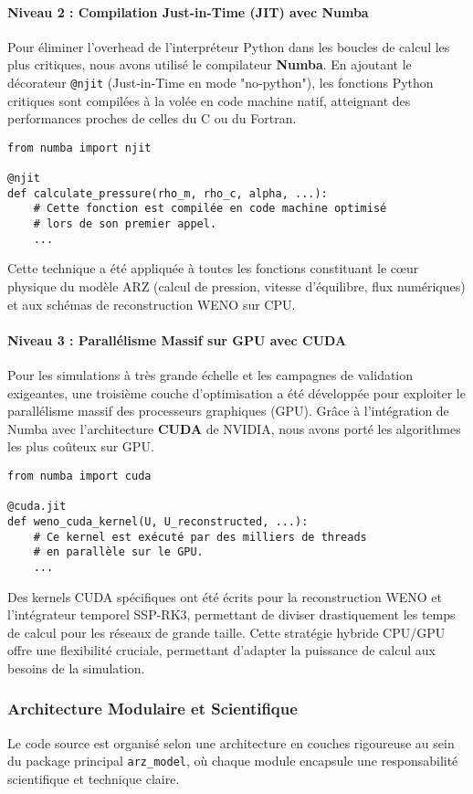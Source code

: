 \paragraph{Niveau 2 : Compilation Just-in-Time (JIT) avec Numba}
Pour éliminer l'overhead de l'interpréteur Python dans les boucles de calcul les plus critiques, nous avons utilisé le compilateur \textbf{Numba}. En ajoutant le décorateur \texttt{@njit} (Just-in-Time en mode "no-python"), les fonctions Python critiques sont compilées à la volée en code machine natif, atteignant des performances proches de celles du C ou du Fortran.
\begin{verbatim}
from numba import njit

@njit
def calculate_pressure(rho_m, rho_c, alpha, ...):
    # Cette fonction est compilée en code machine optimisé
    # lors de son premier appel.
    ...
\end{verbatim}
Cette technique a été appliquée à toutes les fonctions constituant le cœur physique du modèle ARZ (calcul de pression, vitesse d'équilibre, flux numériques) et aux schémas de reconstruction WENO sur CPU.

\paragraph{Niveau 3 : Parallélisme Massif sur GPU avec CUDA}
Pour les simulations à très grande échelle et les campagnes de validation exigeantes, une troisième couche d'optimisation a été développée pour exploiter le parallélisme massif des processeurs graphiques (GPU). Grâce à l'intégration de Numba avec l'architecture \textbf{CUDA} de NVIDIA, nous avons porté les algorithmes les plus coûteux sur GPU.
\begin{verbatim}
from numba import cuda

@cuda.jit
def weno_cuda_kernel(U, U_reconstructed, ...):
    # Ce kernel est exécuté par des milliers de threads
    # en parallèle sur le GPU.
    ...
\end{verbatim}
Des kernels CUDA spécifiques ont été écrits pour la reconstruction WENO et l'intégrateur temporel SSP-RK3, permettant de diviser drastiquement les temps de calcul pour les réseaux de grande taille. Cette stratégie hybride CPU/GPU offre une flexibilité cruciale, permettant d'adapter la puissance de calcul aux besoins de la simulation.

\subsubsection{Architecture Modulaire et Scientifique}
Le code source est organisé selon une architecture en couches rigoureuse au sein du package principal \texttt{arz\_model}, où chaque module encapsule une responsabilité scientifique et technique claire.

